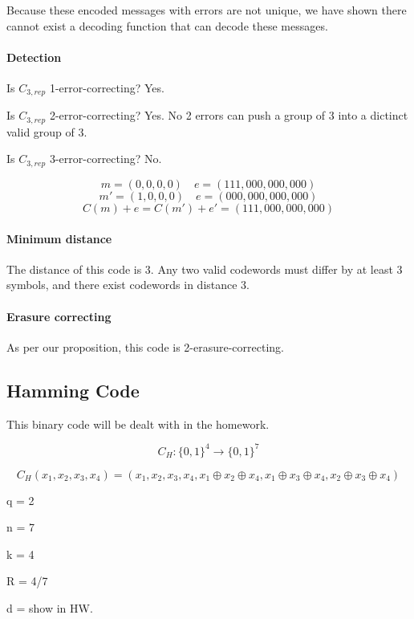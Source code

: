 \documentclass{idc_msc}
\begin{document}
Because these encoded messages with errors are not unique, we have shown there cannot exist a decoding function that can decode these messages.

\paragraph{Detection}

Is $C_{3,rep}$ 1-error-correcting? Yes.

Is $C_{3,rep}$ 2-error-correcting? Yes. No 2 errors can push a group of 3 into a dictinct valid group of 3.

Is $C_{3,rep}$ 3-error-correcting? No.

\[ m = (0,0,0,0) \quad e=(111,000,000,000) \]
\[ m' = (1,0,0,0) \quad e=(000,000,000,000) \]
\[ C(m) + e = C(m') + e' = (111,000,000,000) \]

\paragraph{Minimum distance}

The distance of this code is 3. Any two valid codewords must differ by at least 3 symbols, and there exist codewords in distance 3.

\paragraph{Erasure correcting}

As per our proposition, this code is 2-erasure-correcting.

\subsection{Hamming Code}

This binary code will be dealt with in the homework.

\[ C_H : \{0,1\}^4 \to \{0,1\}^7 \]

\[ C_H(x_1,x_2,x_3,x_4) = (x_1,x_2,x_3,x_4, x_1 \oplus x_2 \oplus x_4, x_1 \oplus x_3 \oplus x_4, x_2 \oplus x_3 \oplus x_4) \]

q = 2

n = 7

k = 4

R = 4/7

d = show in HW.
\end{document}
